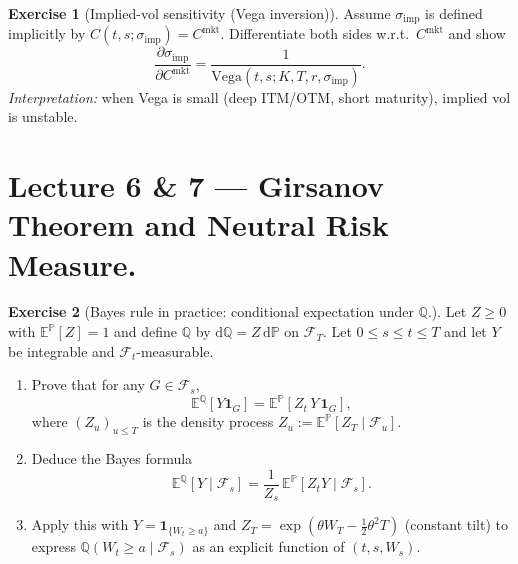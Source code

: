 \documentclass[11pt]{article}
\newcommand{\E}{\mathbb{E}}
\newcommand{\F}{\mathcal{F}}
\newcommand{\1}{\mathbf{1}}
\theoremstyle{definition}
\newtheorem{exercise}{Exercise}[section]
\begin{document}
\begin{exercise}[Implied-vol sensitivity (Vega inversion)]
Assume $\sigma_{\mathrm{imp}}$ is defined implicitly by
$C(t,s;\sigma_{\mathrm{imp}})=C^{\mathrm{mkt}}$.
Differentiate both sides w.r.t.\ $C^{\mathrm{mkt}}$ and show
$$
\boxed{\ \frac{\partial \sigma_{\mathrm{imp}}}{\partial C^{\mathrm{mkt}}}
=
\frac{1}{\text{Vega}(t,s;K,T,r,\sigma_{\mathrm{imp}})}.\ }
$$
\emph{Interpretation:} when Vega is small (deep ITM/OTM, short maturity), implied vol is unstable.
\end{exercise}



\section{Lecture 6 \& 7 --- Girsanov Theorem and Neutral Risk Measure.}




\begin{exercise}[Bayes rule in practice: conditional expectation under $\mathbb{Q}$.]
Let $Z\ge 0$ with $\E^\mathbb{P}[Z]=1$ and define $\mathbb{Q}$ by $\mathrm{d}\mathbb{Q}=Z\,\mathrm{d}\mathbb{P}$ on $\F_T$.
Let $0\le s\le t\le T$ and let $Y$ be integrable and $\F_t$-measurable.
\begin{enumerate}[leftmargin=1.2em, label=(\alph*), itemsep=0.3em]
\item Prove that for any $G\in\F_s$,
$$
\E^\mathbb{Q}[Y\1_G]=\E^\mathbb{P}[Z_t\,Y\,\1_G],
$$
where $(Z_u)_{u\le T}$ is the density process $Z_u:=\E^\mathbb{P}[Z_T\mid \F_u]$.
\item Deduce the Bayes formula
$$
\E^\mathbb{Q}[Y\mid \F_s]=\frac{1}{Z_s}\,\E^\mathbb{P}[Z_tY\mid \F_s].
$$
\item Apply this with $Y=\1_{\{W_t\ge a\}}$ and $Z_T=\exp(\theta W_T-\tfrac12\theta^2T)$
(constant tilt) to express $\mathbb{Q}(W_t\ge a\mid \F_s)$ as an explicit function of $(t,s,W_s)$.
\end{enumerate}
\end{exercise}
\end{document}
